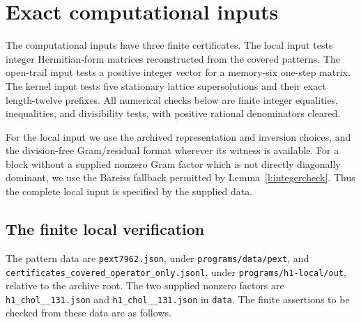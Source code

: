 
\section{Exact computational inputs}

The computational inputs have three finite certificates. The local
input tests integer Hermitian-form matrices reconstructed from the
covered patterns. The open-trail input tests a positive integer
vector for a memory-six one-step matrix. The kernel input
tests five stationary lattice supersolutions and their exact
length-twelve prefixes. All numerical checks below are finite integer equalities,
inequalities, and divisibility tests, with positive rational denominators cleared.

For the local input we use the archived representation and inversion
choices, and the division-free Gram/residual format wherever its
witness is available. For a block without a supplied nonzero Gram
factor which is not directly diagonally dominant, we use the
Bareiss fallback permitted by Lemma~\ref{l:integercheck}. Thus the
complete local input is specified by the supplied data.

\subsection*{The finite local verification}
The pattern data are \texttt{pext7962.json}, under
\texttt{programs/data/pext}, and
\texttt{certificates\_covered\_operator\_only.jsonl}, under
\texttt{programs/h1-local/out}, relative to the archive root.
The two supplied nonzero factors are
\texttt{h1\_chol\_\_\allowbreak131.json} and
\texttt{h1\_chol\_\_\allowbreak131.json} in \texttt{data}.
The finite assertions to be checked from these data are as follows.

